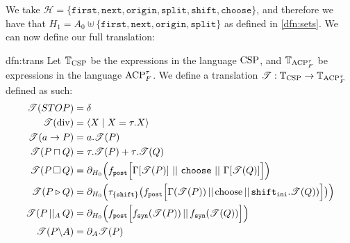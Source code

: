 \documentclass[../hons_project.tex]{subfiles}
\begin{document}
We take $\mathscr{H} = \{\mathtt{first}, \mathtt{next}, \mathtt{origin}, \mathtt{split}, \mathtt{shift}, \mathtt{choose}\}$, and therefore we have that $H_{1} = A_{0} \uplus \{\mathtt{first}, \mathtt{next}, \mathtt{origin}, \mathtt{split}\}$ as defined in \ref{dfn:sets}. We can now define our full translation:

\begin{dfn}{dfn:trans}{}
	Let $\mathbb{T}_{\mathrm{CSP}}$ be the expressions in the language $\mathrm{CSP}$, and $\mathbb{T}_{\mathrm{ACP}_{F}^{\tau}}$ be expressions in the language $\mathrm{ACP}_{F}^{\tau}$. We define a translation $\mathscr{T} : \mathbb{T}_{\mathrm{CSP}} \to \mathbb{T}_{\mathrm{ACP}_{F}^{\tau}}$ defined as such:
	\begin{align*}
		\trans{STOP}           & = \delta                                                                                                                                                                                     \\
		\trans{\mathrm{div}}   & = \langle X \mid X = \tau.X \rangle                                                                                                                                                          \\
		\trans{a \to P}        & = a.\trans{P}                                                                                                                                                                                \\
		\trans{P \intchoice Q} & = \tau.\trans{P} + \tau.\trans{Q}                                                                                                                                                            \\
		\trans{P \extchoice Q} & = \partial_{H_{0}}\Bigl(\fdef{post}\Bigl[\Gamma[\trans{P}]\, \merge \,\mathtt{choose}\, \merge \,\Gamma[\trans{Q}]\Bigl]\Bigr)                                                               \\
		\trans{P \sliding Q}   & = \partial_{H_{0}}\Bigl(\tau_{\{\mathtt{shift}\}}\bigl(f_{\mathtt{post}}\Bigl[ \Gamma(\trans{P}) \merge \mathrm{choose} \merge \mathtt{shift}_{\mathtt{ini}} . \trans{Q}) \Bigr]\bigr)\Bigr) \\
		\trans{P \pcomp Q}     & = \partial_{H_{0}}\Bigl(\fdef{post}\Bigl[\fdef{syn}(\trans{P}) \merge \fdef{syn}(\trans{Q})\Bigr]\Bigr)                                                                                      \\
		\trans{P \backslash A} & = \partial_{A}{\trans{P}}                                                                                                                                                                    \\

\end{align*}
\end{dfn}
\end{document}
